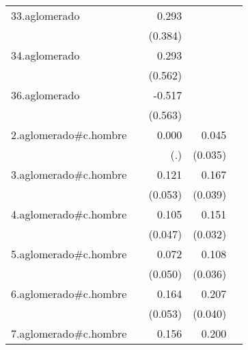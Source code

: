 {\begin{longtable}{l*{4}{D{.}{.}{-1}}}
\addlinespace
33.aglomerado&                     &       0.293         &                     &                     \\
            &                     &     (0.384)         &                     &                     \\
\addlinespace
34.aglomerado&                     &       0.293         &                     &                     \\
            &                     &     (0.562)         &                     &                     \\
\addlinespace
36.aglomerado&                     &      -0.517         &                     &                     \\
            &                     &     (0.563)         &                     &                     \\
\addlinespace
2.aglomerado#c.hombre&                     &       0.000         &       0.045         &                     \\
            &                     &         (.)         &     (0.035)         &                     \\
\addlinespace
3.aglomerado#c.hombre&                     &       0.121\sym{*}  &       0.167\sym{***}&                     \\
            &                     &     (0.053)         &     (0.039)         &                     \\
\addlinespace
4.aglomerado#c.hombre&                     &       0.105\sym{*}  &       0.151\sym{***}&                     \\
            &                     &     (0.047)         &     (0.032)         &                     \\
\addlinespace
5.aglomerado#c.hombre&                     &       0.072         &       0.108\sym{**} &                     \\
            &                     &     (0.050)         &     (0.036)         &                     \\
\addlinespace
6.aglomerado#c.hombre&                     &       0.164\sym{**} &       0.207\sym{***}&                     \\
            &                     &     (0.053)         &     (0.040)         &                     \\
\addlinespace
7.aglomerado#c.hombre&                     &       0.156\sym{**} &       0.200\sym{***}&                     \\

\end{longtable}}
